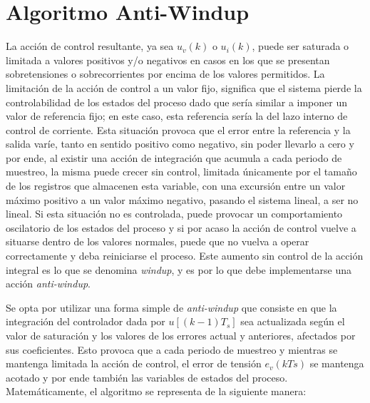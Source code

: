 \section{Algoritmo Anti-Windup}
La acción de control resultante, ya sea $u_v(k)$ o $u_i(k)$, puede ser saturada o limitada a valores positivos y/o negativos en casos en los que se presentan sobretensiones o sobrecorrientes por encima de los valores permitidos. La limitación de la acción de control a un valor fijo, significa que el sistema pierde la controlabilidad de los estados del proceso dado que sería similar a imponer un valor de referencia fijo; en este caso, esta referencia sería la del lazo interno de control de corriente. Esta situación provoca que el error entre la referencia y la salida varíe, tanto en sentido positivo como negativo, sin poder llevarlo a cero y por ende, al existir una acción de integración que acumula a cada periodo de muestreo, la misma puede crecer sin control, limitada únicamente por el tamaño de los registros que almacenen esta variable, con una excursión entre un valor máximo positivo a un valor máximo negativo, pasando el sistema lineal, a ser no lineal. Si esta situación no es controlada, puede provocar un comportamiento oscilatorio de los estados del proceso y si por acaso la acción de control vuelve a situarse dentro de los valores normales, puede que no vuelva a operar correctamente y deba reiniciarse el proceso. Este aumento sin control de la acción integral es lo que se denomina \textit{windup}, y es por lo que debe implementarse una acción \textit{anti-windup}. \par
Se opta por utilizar una forma simple de \textit{anti-windup} que consiste en que la integración del controlador dada por $u[(k-1)T_s]$ sea actualizada según el valor de saturación y los valores de los errores actual y anteriores, afectados por sus coeficientes. Esto provoca que a cada periodo de muestreo y mientras se mantenga limitada la acción de control, el error de tensión $e_v(kTs)$ se mantenga acotado y por ende también las variables de estados del proceso.
Matemáticamente, el algoritmo se representa de la siguiente manera:
